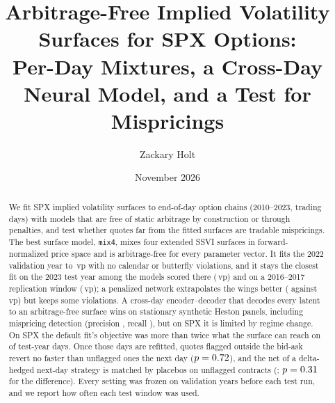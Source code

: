 \documentclass[11pt]{article}
\title{Arbitrage-Free Implied Volatility Surfaces for SPX Options:\\
Per-Day Mixtures, a Cross-Day Neural Model, and a Test for Mispricings}
\author{Zackary Holt}
\date{November 2026}
\newcommand{\vp}{\,vp}
\newcommand{\mixfour}{\texttt{mix4}}
\begin{document}
\maketitle

\begin{abstract}
\noindent
We fit SPX implied volatility surfaces to end-of-day option chains (2010--2023, \spxDays{} trading
days) with models that are free of static arbitrage by construction or through penalties, and test
whether quotes far from the fitted surfaces are tradable mispricings. The best surface model,
\mixfour, mixes four extended SSVI surfaces in forward-normalized price space and is arbitrage-free
for every parameter vector. It fits the 2022 validation year to \mixFitVal\vp{} with no calendar or
butterfly violations, and it stays the closest fit on the 2023 test year among the models scored
there (\mixFitTest\vp) and on a 2016--2017 replication window (\mixFitRep\vp); a penalized network extrapolates the wings better
(\pnnWingVal{} against \mixWingVal\vp) but keeps some violations. A cross-day encoder--decoder that
decodes every latent to an arbitrage-free surface wins on stationary synthetic Heston panels,
including mispricing detection (precision \multiPrecFresh, recall \multiRecFresh), but on SPX it is
limited by regime change. On SPX the default fit's objective was more than twice what the surface
can reach on  of  test-year days. Once those days are refitted, quotes flagged
outside the bid-ask revert no faster than unflagged ones the next day ($p=0.72$), and the
\btNet{} net of a delta-hedged next-day strategy is matched by placebos on unflagged contracts
(\btPlacebo; $p=0.31$ for the difference). Every setting was frozen on validation years before each
test run, and we report how often each test window was used.
\end{abstract}











\appendix

\end{document}

